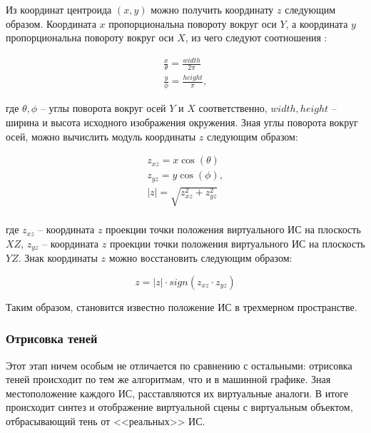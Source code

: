 Из координат центроида $(x, y)$ можно получить координату $z$ следующим образом. Координата $x$ пропорциональна повороту вокруг оси $Y$, а координата $y$ пропорциональна повороту вокруг оси $X$, из чего следуют соотношения \cite{osti2019real}:

\begin{equation}
	\begin{split}
		\frac{x}{\theta} = \frac{width}{2\pi} \\
		\frac{y}{\phi} = \frac{height}{\pi},
	\end{split}
\end{equation}

где $\theta, \phi$ -- углы поворота вокруг осей $Y$ и $X$ соответственно, $width, height$ -- ширина и высота исходного изображения окружения. Зная углы поворота вокруг осей, можно вычислить модуль координаты $z$ следующим образом:

\begin{equation}
	\begin{split}
		z_{xz} = x\cos(\theta) \\
		z_{yz} = y\cos(\phi), \\
		|z| = \sqrt{z_{xz} ^ 2 + z_{yz} ^ 2} \\
	\end{split}
\end{equation}

где $z_{xz}$ -- координата $z$ проекции точки положения виртуального ИС на плоскость $XZ$, $z_{yz}$ -- координата $z$ проекции точки положения виртуального ИС на плоскость $YZ$. Знак координаты $z$ можно восстановить следующим образом:

\begin{equation}
	z = |z| \cdot sign(z_{xz} \cdot z_{yz})
\end{equation}

Таким образом, становится известно положение ИС в трехмерном пространстве.

\subsubsection*{Отрисовка теней}

Этот этап ничем особым не отличается по сравнению с остальными: отрисовка теней происходит по тем же алгоритмам, что и в машинной графике. Зная местоположение каждого ИС, расставляются их виртуальные аналоги. В итоге происходит синтез и отображение виртуальной сцены с виртуальным объектом, отбрасывающий тень от <<реальных>> ИС.

